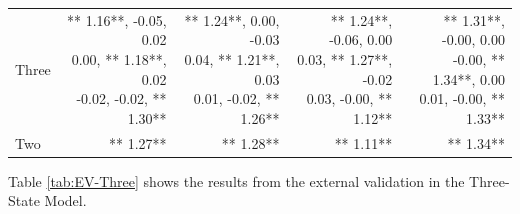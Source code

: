 \documentclass[12pt,PhD,twoside,openright]{muthesis}
\begin{document}
\begin{table}[!h]
\begin{tabular}[t]{l>{\ttfamily}r>{\ttfamily}r>{\ttfamily}r>{\ttfamily}r}
\hspace{1em}Three & \makecell[l]{** 1.16**, -0.05,  0.02\\  0.00, ** 1.18**,  0.02\\ -0.02, -0.02, ** 1.30**} & \makecell[l]{** 1.24**,  0.00, -0.03\\  0.04, ** 1.21**,  0.03\\  0.01, -0.02, ** 1.26**} & \makecell[l]{** 1.24**, -0.06,  0.00\\  0.03, ** 1.27**, -0.02\\  0.03, -0.00, ** 1.12**} & \makecell[l]{** 1.31**, -0.00,  0.00\\ -0.00, ** 1.34**,  0.00\\  0.01, -0.00, ** 1.33**}\\
\hspace{1em}Two & ** 1.27** & ** 1.28** & ** 1.11** & ** 1.34**\\
\bottomrule
\end{tabular}
\end{table}
Table \ref{tab:EV-Three} shows the results from the external validation in the Three-State Model.
\end{document}
